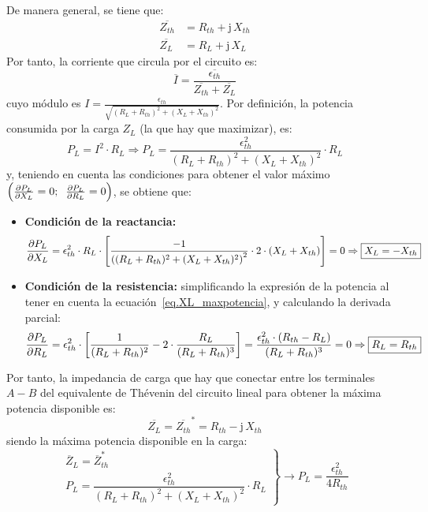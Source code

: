 De manera general, se tiene que: 
\begin{align*}
  \overline{Z_{th}} &= R_{th} + \mathrm{j}\,X_{th}\\
  \overline{Z_L} &= R_L + \mathrm{j}\,X_L
\end{align*}
Por tanto, la corriente que circula por el circuito es: 
\begin{equation*}
\overline{I} = \frac{\overline{\epsilon_{th}}}{\overline{Z_{th}} + \overline{Z_L}}
\end{equation*}
cuyo módulo es $I=\frac{\epsilon_{th}}{\sqrt{(R_L+R_{th})^2+(X_L+X_{th})^2}}$. Por definición, la potencia consumida por la carga $Z_L$ (la que hay que maximizar), es: 
\begin{equation*}
   P_L= I^2 \cdot R_L\Rightarrow P_L = \dfrac{\epsilon_{th}^2}{{(R_L+R_{th})^2+(X_L+X_{th})^2}} \cdot R_L
\end{equation*}
y, teniendo en cuenta las condiciones para obtener el valor máximo $\left(\diffp{P_L}{X_L} = 0;\;\;    \diffp{P_L}{R_L} = 0\right)$, se obtiene que: 
\begin{itemize}
    \item \textbf{Condición de la reactancia:}
    \begin{equation}\label{eq.XL_maxpotencia}
        \diffp{P_L}{X_L} = \epsilon^2_{th} \cdot R_L \cdot \left[\frac{-1}{\left((R_L + R_{th})^2 + (X_L + X_{th})^2\right)^2} \cdot 2 \cdot (X_L + X_{th})\right]=0\Rightarrow \boxed{X_L = - X_{th}}
    \end{equation}
    \item \textbf{Condición de la resistencia:} simplificando la expresión de la potencia al tener en cuenta la ecuación~\eqref{eq.XL_maxpotencia}, y calculando la derivada parcial: 
    \begin{equation}\label{eq.R_maxpotencia}
        \diffp{P_L}{R_L} = \epsilon^2_{th} \cdot \left[\frac{1}{(R_L + R_{th})^2} - 2 \cdot \frac{R_L}{(R_L + R_{th})^3}\right]= \frac{\epsilon^2_{th} \cdot (R_{th} - R_L)}{(R_L + R_{th})^3}=0\Rightarrow \boxed{R_L = R_{th}}
    \end{equation}
\end{itemize}
Por tanto, la impedancia de carga que hay que conectar entre los terminales $A-B$ del equivalente de Thévenin del circuito lineal para obtener la máxima potencia disponible es:
\begin{equation}
    \boxed{\overline{Z_L} = \overline{Z_{th}}^*=R_{th}-\mathrm{j}\,X_{th}}
\end{equation}
siendo la máxima potencia disponible en la carga:
\begin{equation}
  \left.
    \begin{matrix}
      \overline{Z}_L = \overline{Z}_{th}^*\\
      P_L = \dfrac{\epsilon_{th}^2}{{(R_L+R_{th})^2+(X_L+X_{th})^2}} \cdot R_L
    \end{matrix} \right\}\rightarrow
  \boxed{P_L = \frac{\epsilon^2_{th}}{4 R_{th}}}
\end{equation}

